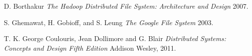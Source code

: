\documentclass[times, 10pt,twocolumn]{article}
\begin{document}




\begin{thebibliography}{1}

   D. Borthakur {\em The Hadoop Distributed File System: Architecture and Design}  2007.

    S. Ghemawat, H. Gobioff, and S. Leung {\em The Google File System} 2003.

   T. K. George Coulouris, Jean Dollimore and G. Blair {\em Distributed Systems: Concepts and Design Fifth Edition} Addison Wesley, 2011.

\end{thebibliography}
\end{document}
